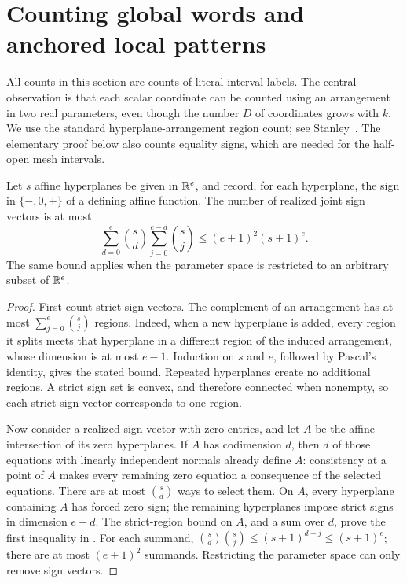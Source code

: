 \section{Counting global words and anchored local patterns}\label{sec:counting}

All counts in this section are counts of literal interval labels.
The central observation is that each scalar coordinate can be counted
using an arrangement in two real parameters, even though the number
$D$ of coordinates grows with $k$.
We use the standard hyperplane-arrangement region count; see
Stanley~\cite[Lemma~2.1 and Proposition~2.4]{stanley2007}.
The elementary proof below also counts equality signs, which are needed
for the half-open mesh intervals.

\begin{lemma}\label{count:arrangement}
Let $s$ affine hyperplanes be given in $\mathbb R^e$, and record, for each
hyperplane, the sign in $\{-,0,+\}$ of a defining affine function.
The number of realized joint sign vectors is at most
\begin{equation}\label{count:arrangement-bound}
 \sum_{d=0}^e\binom{s}{d}\sum_{j=0}^{e-d}\binom{s}{j}
 \le(e+1)^2(s+1)^e.
\end{equation}
The same bound applies when the parameter space is restricted to an
arbitrary subset of $\mathbb R^e$.
\end{lemma}

\begin{proof}
First count strict sign vectors. The complement of an arrangement
has at most $\sum_{j=0}^e\binom{s}{j}$ regions. Indeed, when a new
hyperplane is added, every region it splits meets that hyperplane in
a different region of the induced arrangement, whose dimension is
at most $e-1$. Induction on $s$ and $e$, followed by Pascal's identity,
gives the stated bound. Repeated hyperplanes create no additional
regions. A strict sign set is convex, and therefore connected when
nonempty, so each strict sign vector corresponds to one region.

Now consider a realized sign vector with zero entries, and let $A$
be the affine intersection of its zero hyperplanes. If $A$ has
codimension $d$, then $d$ of those equations with linearly independent
normals already define $A$: consistency at a point of $A$ makes every
remaining zero equation a consequence of the selected equations.
There are at most $\binom{s}{d}$ ways to select them. On $A$, every
hyperplane containing $A$ has forced zero sign; the remaining
hyperplanes impose strict signs in dimension $e-d$. The strict-region
bound on $A$, and a sum over $d$, prove the first inequality in
. For each summand,
$\binom{s}{d}\binom{s}{j}\le(s+1)^{d+j}\le(s+1)^e$;
there are at most $(e+1)^2$ summands. Restricting the parameter space
can only remove sign vectors.
\end{proof}

